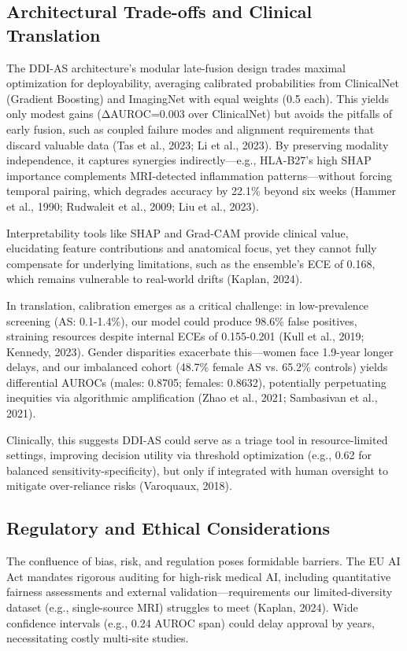 \documentclass[12pt, a4paper]{article}
\begin{document}
\subsection{Architectural Trade-offs and Clinical Translation}
The DDI-AS architecture's modular late-fusion design trades maximal optimization for deployability, averaging calibrated probabilities from ClinicalNet (Gradient Boosting) and ImagingNet with equal weights (0.5 each). This yields only modest gains (ΔAUROC=0.003 over ClinicalNet) but avoids the pitfalls of early fusion, such as coupled failure modes and alignment requirements that discard valuable data (Tas et al., 2023; Li et al., 2023). By preserving modality independence, it captures synergies indirectly—e.g., HLA-B27's high SHAP importance complements MRI-detected inflammation patterns—without forcing temporal pairing, which degrades accuracy by 22.1\% beyond six weeks (Hammer et al., 1990; Rudwaleit et al., 2009; Liu et al., 2023). 

Interpretability tools like SHAP and Grad-CAM provide clinical value, elucidating feature contributions and anatomical focus, yet they cannot fully compensate for underlying limitations, such as the ensemble's ECE of 0.168, which remains vulnerable to real-world drifts (Kaplan, 2024).

In translation, calibration emerges as a critical challenge: in low-prevalence screening (AS: 0.1-1.4\%), our model could produce 98.6\% false positives, straining resources despite internal ECEs of 0.155-0.201 (Kull et al., 2019; Kennedy, 2023). Gender disparities exacerbate this—women face 1.9-year longer delays, and our imbalanced cohort (48.7\% female AS vs. 65.2\% controls) yields differential AUROCs (males: 0.8705; females: 0.8632), potentially perpetuating inequities via algorithmic amplification (Zhao et al., 2021; Sambasivan et al., 2021). 

Clinically, this suggests DDI-AS could serve as a triage tool in resource-limited settings, improving decision utility via threshold optimization (e.g., 0.62 for balanced sensitivity-specificity), but only if integrated with human oversight to mitigate over-reliance risks (Varoquaux, 2018).

\subsection{Regulatory and Ethical Considerations}
The confluence of bias, risk, and regulation poses formidable barriers. The EU AI Act mandates rigorous auditing for high-risk medical AI, including quantitative fairness assessments and external validation—requirements our limited-diversity dataset (e.g., single-source MRI) struggles to meet (Kaplan, 2024). Wide confidence intervals (e.g., 0.24 AUROC span) could delay approval by years, necessitating costly multi-site studies. 
\end{document}
